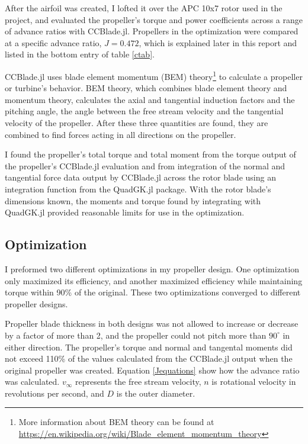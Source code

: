 \documentclass[journal ]{new-aiaa}
\newcounter{ctab}
\begin{document}
After the airfoil was created, I lofted it over the APC 10x7 rotor used in the project, and evaluated the propeller's torque and power coefficients across a range of advance ratios with CCBlade.jl. Propellers in the optimization were compared at a specific advance ratio, $J=0.472$, which is explained later in this report and listed in the bottom entry of table \eqref{ctab}. 

CCBlade.jl uses blade element momentum (BEM) theory\footnote{More information about BEM theory can be found at \url{https://en.wikipedia.org/wiki/Blade_element_momentum_theory}} to calculate a propeller or turbine's behavior. BEM theory, which combines blade element theory and momentum theory, calculates the axial and tangential induction factors and the pitching angle, the angle between the free stream velocity and the tangential velocity of the propeller. After these three quantities are found, they are combined to find forces acting in all directions on the propeller\cite{CCBlade}. 

I found the propeller's total torque and total moment from the torque output of the propeller's CCBlade.jl evaluation and from integration of the normal and tangential force data output by CCBlade.jl across the rotor blade using an integration function from the QuadGK.jl package. With the rotor blade's dimensions known, the moments and torque found by integrating with QuadGK.jl provided reasonable limits for use in the optimization.

\subsection{Optimization}

I preformed two different optimizations in my propeller design. One optimization only maximized its efficiency, and another maximized efficiency while maintaining torque within 90\% of the original. These two optimizations converged to different propeller designs. 

Propeller blade thickness in both designs was not allowed to increase or decrease by a factor of more than 2, and the propeller could not pitch more than $90^{\circ}$ in either direction. The propeller's torque and normal and tangental moments did not exceed 110\% of the values calculated from the CCBlade.jl output when the original propeller was created. Equation \eqref{Jequations} show how the advance ratio was calculated. $v_{\infty}$ represents the free stream velocity, $n$ is rotational velocity in revolutions per second, and $D$ is the outer diameter.
\end{document}
